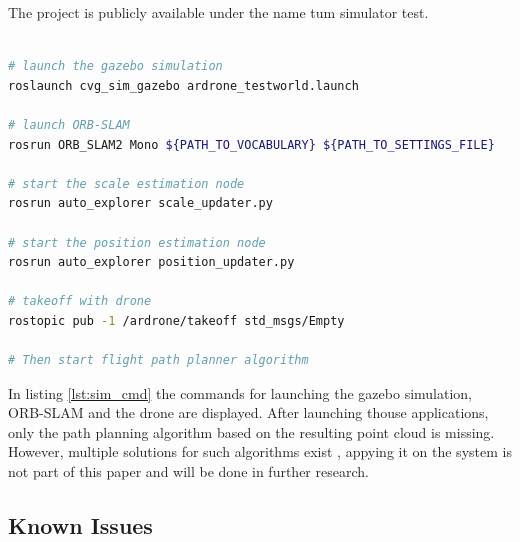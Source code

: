	The project is publicly available under the name tum simulator test.
	
	\begin{lstlisting}[language=bash, caption= Launching the simulated environment, label=lst:sim_cmd]
	
# launch the gazebo simulation
roslaunch cvg_sim_gazebo ardrone_testworld.launch
	
# launch ORB-SLAM
rosrun ORB_SLAM2 Mono ${PATH_TO_VOCABULARY} ${PATH_TO_SETTINGS_FILE}

# start the scale estimation node
rosrun auto_explorer scale_updater.py

# start the position estimation node
rosrun auto_explorer position_updater.py
	
# takeoff with drone 
rostopic pub -1 /ardrone/takeoff std_msgs/Empty

# Then start flight path planner algorithm

	\end{lstlisting}
	
	In listing \ref{lst:sim_cmd} the commands for launching the gazebo simulation, ORB-SLAM and the drone are displayed. After launching thouse 
	applications, only the path planning algorithm based on the resulting point cloud is missing. However, multiple solutions for such algorithms 
	exist \cite{path}, appying it on the system is not part of this paper and will be done in further research. 

	\subsection{Known Issues} \label{frameissues}
	
